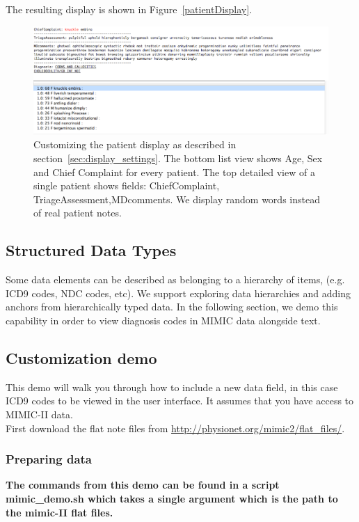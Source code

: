 \documentclass[12pt]{article}
\begin{document}
The resulting display is shown in Figure~\ref{patientDisplay}.
\begin{figure}[ht]
	\begin{center}
		\includegraphics[scale=0.5]{patientDisplayScreenshot}
	\end{center}
	\caption{\label{patientDisplay} Customizing the patient display as described in section~\ref{sec:display_settings}. The bottom list view shows Age, Sex and Chief Complaint for every patient. The top detailed view of a single patient shows fields: ChiefComplaint, TriageAssessment,MDcomments. We display random words instead of real patient notes.}
	\label{fig:figure1}
\end{figure}

\subsection{Structured Data Types}
Some data elements can be described as belonging to a hierarchy of items, (e.g. ICD9 codes, NDC codes, etc). 
We support exploring data hierarchies and adding anchors from hierarchically typed data.
In the following section, we demo this capability in order to view diagnosis codes in MIMIC data alongside text.

\subsection{Customization demo}
\label{sec:customization demo}
This demo will walk you through how to include a new data field, in this case ICD9 codes to be viewed in the user interface. It assumes that you have access to MIMIC-II data.\\
First download the flat note files from \url{http://physionet.org/mimic2/flat_files/}.

\subsubsection{Preparing data}
{\bf The commands from this demo can be found in a script mimic\_demo.sh which takes a single argument which is the path to the mimic-II flat files.} 
\end{document}
